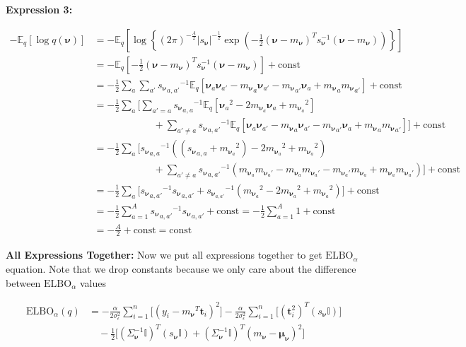 \documentclass[letterpaper,12pt]{article}
\newcommand{\lc}{\left \{} %
\newcommand{\rc}{\right \}} %
\newcommand{\lp}{\left (} %
\newcommand{\rp}{\right )} %
\newcommand{\lb}{\left [} %
\newcommand{\rb}{\right ]} %
\newcommand{\sigmaepsilon}{\sigma_\epsilon^2} %
\newcommand{\nuv}{\boldsymbol{\nu}} %
\newcommand{\ti}{\boldsymbol{t}_i} %
\newcommand{\Sigmanu}{\Sigma_{\nuv}} %
\newcommand{\mnu}{\ensuremath{m_\nuv}} %
\newcommand{\snu}{\ensuremath{s_\nuv}} %
\newcommand{\nua}{\ensuremath{\nuv_a}} %
\newcommand{\mnusub}[1]{\ensuremath{m_{\nuv_#1}}} %
\newcommand{\elbo}{\ensuremath{\mathrm{ELBO}}}
\newcommand{\E}{\mathbb{E}_q}
\begin{document}
\textbf{Expression 3:}

\begin{equation}
\begin{split}
    - \E \lb \log q(\nuv) \rb &= -   \E \lb \log \lc (2 \pi)^{-\frac{A}{2}} | s_{\nuv} | ^{- \frac{1}{2}} \exp \lp - \frac{1}{2} (\nuv - {\mnu})^T s_{\nuv}^{-1} (\nuv - {\mnu})\rp \rc \rb \\
    &= -   \E \lb - \frac{1}{2} (\nuv - {\mnu})^T s_{\nuv}^{-1} (\nuv - {\mnu}) \rb + \textrm{const}\\
    &= - \frac{1}{2} \sum_a \sum_{a'} {\snu_{a,a'}}^{-1} \E \lb \nuv_a \nuv_{a'} - {\mnu_a} \nuv_{a'} - {\mnu_{a'}} \nuv_a + {\mnu_a} {\mnu_{a'}} \rb + \textrm{const} \\
    &= - \frac{1}{2} \sum_a \Bigg[ \sum_{a' = a}  {\snu_{a,a}}^{-1} \E \lb \nua^2 - 2 \mnusub{a} \nua + \mnusub{a}^2 \rb \\
    & \qquad \qquad \qquad + \sum_{a' \neq a}  {\snu_{a,a'}}^{-1} \E \lb \nuv_a \nuv_{a'} - {\mnu_a} \nuv_{a'} - {\mnu_{a'}} \nuv_a + {\mnu_a} {\mnu_{a'}} \rb \Bigg] + \textrm{const} \\
    &= - \frac{1}{2} \sum_a \Bigg[  {\snu_{a,a}}^{-1} \lp \lp {\snu_{a,a}} + \mnusub{a}^2\rp - 2 \mnusub{a}^2 + \mnusub{a}^2 \rp \\
    & \qquad \qquad \qquad + \sum_{a' \neq a}  {\snu_{a,a'}}^{-1} \lp \mnusub{a} \mnusub{a'} - \mnusub{a} \mnusub{a'} - \mnusub{a'} \mnusub{a} + \mnusub{a} \mnusub{a'}\rp \Bigg] + \textrm{const} \\
    &= - \frac{1}{2} \sum_a \Bigg[ {\snu_{a,a'}}^{-1} {\snu_{a,a'}} + {s_{\nuv}_{a,a'}}^{-1} \lp  \mnusub{a}^2 - 2 \mnusub{a}^2 + \mnusub{a}^2 \rp \Bigg] + \textrm{const} \\
    &= - \frac{1}{2} \sum_{a=1}^A {\snu_{a,a'}}^{-1} {\snu_{a,a'}} + \textrm{const} = - \frac{1}{2} \sum_{a=1}^A 1 + \textrm{const} \\
    &= - \frac{  A}{2} + \textrm{const} = \textrm{const}
\end{split}
\end{equation}


\textbf{All Expressions Together:} Now we put all expressions together to get $\elbo_\alpha$ equation. Note that we drop constants because we only care about the difference between $\elbo_\alpha$ values

\begin{equation}
\begin{split}
    \elbo_\alpha(q) &= -\frac{\alpha}{2 \sigmaepsilon} \sum_{i=1}^n \Bigg[(y_i - {\mnu}^T \ti)^2 \Bigg] -\frac{\alpha}{2 \sigmaepsilon} \sum_{i=1}^n \Bigg[ (\ti^2)^T ({\snu} \mathbb{I}) \Bigg] \\
    & \quad - \frac{1}{2} \Bigg[ (\Sigmanu^{-1} \mathbb{I} )^T (s_{\nuv} \mathbb{I}) + (\Sigmanu^{-1} \mathbb{I} )^T (m_{\nuv}  - \boldsymbol{\mu}_{\nuv} )^2 \Bigg] \\
\end{split}
\end{equation}
\end{document}
